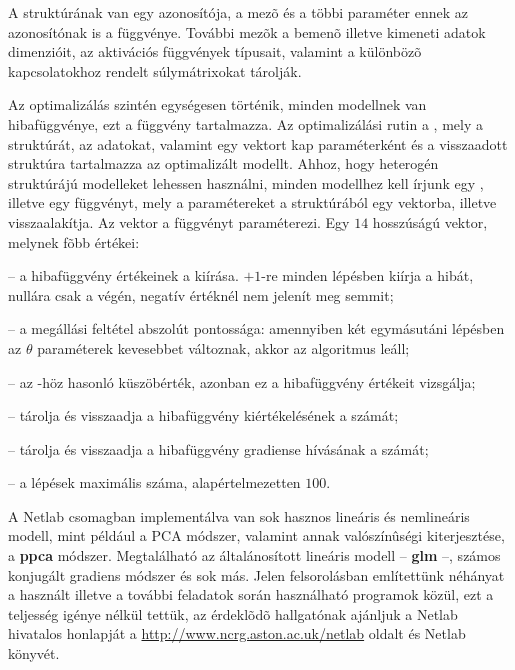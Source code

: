 A  struktúrának van egy azonosítója, a 
mezõ és a többi paraméter ennek az azonosítónak is a függvénye.
További mezõk a bemenõ illetve kimeneti adatok dimenzióit, az
aktivációs függvények típusait, valamint a különbözõ
kapcsolatokhoz rendelt súlymátrixokat tárolják.

Az optimalizálás szintén egységesen történik, minden modellnek van
hibafüggvénye, ezt a  függvény tartalmazza.
Az optimalizálási rutin a , mely a struktúrát, az
adatokat, valamint egy  vektort kap paraméterként és
a visszaadott struktúra tartalmazza az optimalizált modellt.
Ahhoz, hogy heterogén struktúrájú modelleket lehessen használni,
minden modellhez kell írjunk egy , illetve
egy  függvényt, mely a paramétereket a
struktúrából egy vektorba, illetve visszaalakítja. Az
 vektor a  függvényt paraméterezi. Egy
$14$ hosszúságú vektor, melynek fõbb értékei: {
\renewcommand{\baselinestretch}{0.98}\normalsize
\begin{description}
    \setlength{\itemsep}{0.04mm}
    \item[\code{options(1)}] -- a hibafüggvény értékeinek a kiírása. $+1$-re minden lépésben kiírja a hibát, nullára csak a végén, negatív értéknél nem jelenít meg semmit;
    \item[\code{options(2)}] -- a megállási feltétel abszolút pontossága: amennyiben két egymásutáni lépésben az $\theta$ paraméterek kevesebbet változnak, akkor az algoritmus leáll;
    \item[\code{options(3)}] -- az -höz hasonló küszöbérték, azonban ez a hibafüggvény értékeit vizsgálja;

    \item[\code{options(10)}] -- tárolja és visszaadja a hibafüggvény kiértékelésének a számát;

    \item[\code{options(11)}] -- tárolja és visszaadja a hibafüggvény gradiense hívásának a számát;

    \item[\code{options(14)}] -- a lépések maximális száma, alapértelmezetten $100$.
\end{description}
}

A {Netlab} csomagban implementálva van sok hasznos lineáris és
nemlineáris modell, mint például a PCA módszer, valamint annak valószínûségi
kiterjesztése, a {\bf ppca} módszer. Megtalálható az
általánosított lineáris modell -- {\bf glm} --, számos konjugált
gradiens módszer és sok más. Jelen felsorolásban említettünk
néhányat a használt illetve a további feladatok során használható
programok közül, ezt a teljesség igénye nélkül tettük, az
érdeklõdõ hallgatónak ajánljuk a {Netlab} hivatalos honlapját a
\url{http://www.ncrg.aston.ac.uk/netlab}\label{link:netlab2}
oldalt és  {Netlab} könyvét.

